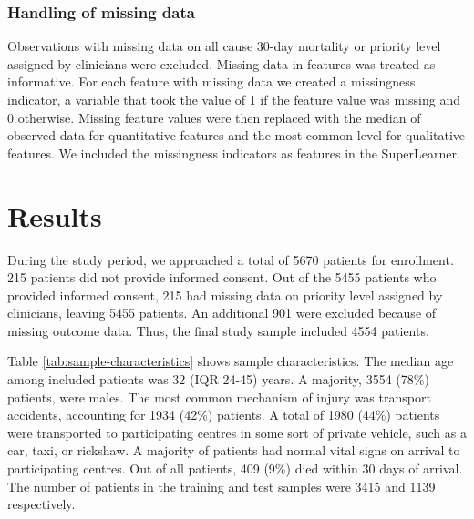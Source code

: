 \documentclass[10pt,letterpaper]{article}\usepackage[]{graphicx}\usepackage[]{color}
\begin{document}
\subsubsection*{Handling of missing data}
Observations with missing data on all cause 30-day mortality or priority level
assigned by clinicians were excluded. Missing data in features was treated as
informative. For each feature with missing data we created a missingness
indicator, a variable that took the value of 1 if the feature value was missing
and 0 otherwise. Missing feature values were then replaced with the median of
observed data for quantitative features and the most common level for
qualitative features. We included the missingness indicators as features in the
SuperLearner.

\section*{Results}
During the study period, we approached a total of 5670 patients
for enrollment. 215 patients did
not provide informed consent. Out of the 5455
patients who provided informed consent, 215 had missing data on priority level
assigned by clinicians, leaving 5455
patients. An additional 901 were excluded because of missing outcome
data. Thus, the final study sample included
4554 patients.

Table \ref{tab:sample-characteristics} shows sample characteristics. The median
age among included patients was 32 (IQR 24-45) years. A majority,
3554 (78\%) patients, were males. The most common mechanism
of injury was transport accidents, accounting for 1934 (42\%) patients. A total of 1980 (44\%) patients were transported to participating centres in some sort of
private vehicle, such as a car, taxi, or rickshaw. A majority of patients had
normal vital signs on arrival to participating centres. Out of all patients,
409 (9\%) died within 30 days of arrival. The number of
patients in the training and test samples were 3415 and
1139 respectively.
\end{document}
